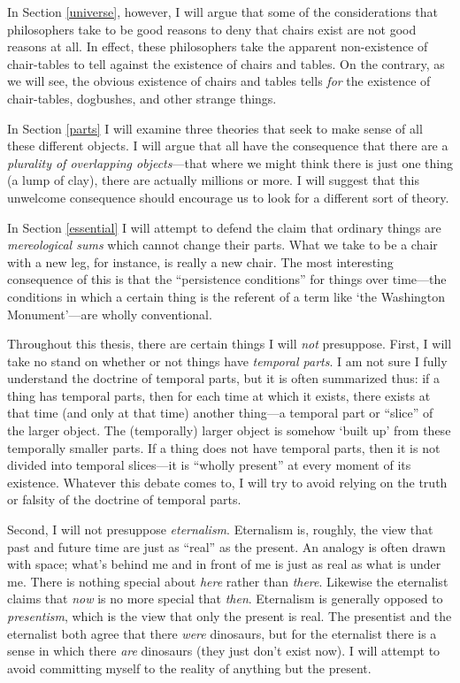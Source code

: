 \documentclass[11pt]{article}
\begin{document}
\begin{spacing}{1.5}
In Section \ref{universe}, however, I will argue that some of the
considerations that philosophers take to be good reasons to deny that
chairs exist are not good reasons at all.  In effect, these
philosophers take the apparent non-existence of chair-tables to tell
against the existence of chairs and tables.  On the contrary, as we
will see, the obvious existence of chairs and tables tells {\em for}
the existence of chair-tables, dogbushes, and other strange things.

In Section \ref{parts} I will examine three theories that seek to make
sense of all these different objects.  I will argue that all have the
consequence that there are a {\em plurality of overlapping
  objects}---that where we might think there is just one thing (a lump
of clay), there are actually millions or more.  I will suggest that
this unwelcome consequence should encourage us to look for a different
sort of theory.

In Section \ref{essential} I will attempt to defend the claim that
ordinary things are {\em mereological sums} which cannot change their
parts.  What we take to be a chair with a new leg, for instance, is
really a new chair.  The most interesting consequence of this is that
the ``persistence conditions'' for things over time---the conditions
in which a certain thing is the referent of a term like `the
Washington Monument'---are wholly conventional.

Throughout this thesis, there are certain things I will {\em not}
presuppose.  First, I will take no stand on whether or not things have
{\em temporal parts}.  I am not sure I fully understand the doctrine
of temporal parts, but it is often summarized thus: if a thing has
temporal parts, then for each time at which it exists, there exists at
that time (and only at that time) another thing---a temporal part or
``slice'' of the larger object.  The (temporally) larger object is
somehow `built up' from these temporally smaller parts.  If a thing
does not have temporal parts, then it is not divided into temporal
slices---it is ``wholly present'' at every moment of its existence.
Whatever this debate comes to, I will try to avoid relying on the
truth or falsity of the doctrine of temporal parts.

Second, I will not presuppose {\em eternalism}.  Eternalism is,
roughly, the view that past and future time are just as ``real'' as
the present.  An analogy is often drawn with space; what's behind me
and in front of me is just as real as what is under me.  There is
nothing special about {\em here} rather than {\em there}.  Likewise
the eternalist claims that {\em now} is no more special that {\em
  then}.  Eternalism is generally opposed to {\em presentism}, which
is the view that only the present is real.  The presentist and the
eternalist both agree that there {\em were} dinosaurs, but for the
eternalist there is a sense in which there {\em are} dinosaurs (they
just don't exist now).  I will attempt to avoid committing myself to
the reality of anything but the present.

\ifstandalone
\end{spacing}


\fi
\end{document}
